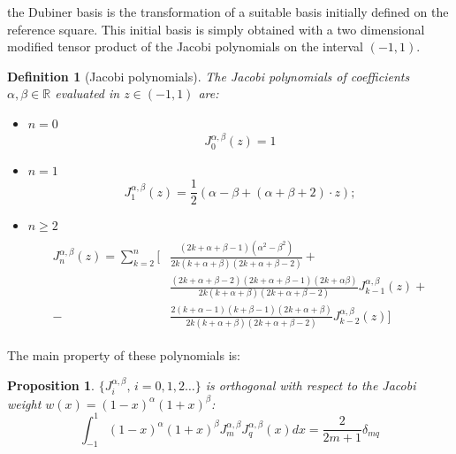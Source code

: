 \documentclass[a4paper,11pt]{article}
\newtheorem{definition}{Definition}
\newtheorem{prop}{Proposition}
\begin{document}
    \noindent the Dubiner basis is the transformation of a suitable basis initially defined on the reference square. This initial basis is simply obtained with a two dimensional modified tensor product of the Jacobi polynomials on the interval $(-1,1)$. \\

    \begin{definition}[Jacobi polynomials]
    The Jacobi polynomials of coefficients $\alpha,\beta \in \mathbb{R}$ evaluated in $z\in (-1,1)$ are:
    \begin{itemize}[label=\textendash]
    \item $n=0$
    \begin{equation}
    J_0^{\alpha,\beta}(z)=1
    \end{equation}
    \item $n=1$
    \begin{equation}
    J_1^{\alpha,\beta}(z)=\frac{1}{2}(\alpha-\beta+(\alpha+\beta+2)\cdot z);
    \end{equation}
    \item $n\ge2$
    \newline
    \begin{equation}
    \begin{gathered}
    \begin{aligned}
    J_n^{\alpha,\beta}(z)=\sum_{k=2}^{n} \Big[&\frac{(2k+\alpha+\beta-1)(\alpha^{2}-\beta^{2})}{2k(k+\alpha+\beta)(2k+\alpha+\beta-2)}+ \\ &\frac{(2k+\alpha+\beta-2)(2k+\alpha+\beta-1)(2k+\alpha \beta)}{2k(k+\alpha+\beta)(2k+\alpha+\beta-2)} J_{k-1}^{\alpha,\beta}(z) +
    \\-&\frac{2(k+\alpha-1)(k+\beta-1)(2k+\alpha+\beta)}{2k(k+\alpha+\beta)(2k+\alpha+\beta-2)} J_{k-2}^{\alpha,\beta}(z) \Big]
    \end{aligned}
    \end{gathered}
    \end{equation}
    \end{itemize}
    \end{definition}
    \vspace{5mm}
    \noindent The main property of these polynomials is:
    \begin{prop}
    $\{J_i^{\alpha,\beta}, \, i=0,1,2 \dots\}$ is orthogonal with respect to the Jacobi weight $w(x)=(1-x)^\alpha(1+x)^\beta$:
    \begin{equation}
    \int_{-1}^{1}{(1-x)^\alpha(1+x)^\beta J_m^{\alpha,\beta} J_q^{\alpha,\beta}(x)dx}=\frac{2}{2m+1} \delta_{mq} 
    \end{equation}
    \end{prop}
    
\end{document}
